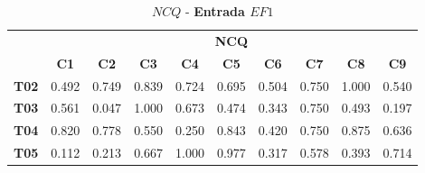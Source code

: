 \begin{table}[htbp]
	\centering
	\caption{$NCQ$ - \textbf{Entrada $EF1$}}
	\begin{tabular}{|c|ccccccccc|}
		\hline
		\rowcolor[HTML]{D0CECE} 
		\cellcolor[HTML]{D0CECE} & \multicolumn{9}{c|}{\cellcolor[HTML]{D0CECE}\textbf{NCQ}} \\ \cline{2-10} 
		\rowcolor[HTML]{D0CECE} 
		\multirow{-2}{*}{\cellcolor[HTML]{D0CECE}\textbf{Part.}} & \multicolumn{1}{c|}{\cellcolor[HTML]{D0CECE}\textbf{C1}} & \multicolumn{1}{c|}{\cellcolor[HTML]{D0CECE}\textbf{C2}} & \multicolumn{1}{c|}{\cellcolor[HTML]{D0CECE}\textbf{C3}} & \multicolumn{1}{c|}{\cellcolor[HTML]{D0CECE}\textbf{C4}} & \multicolumn{1}{c|}{\cellcolor[HTML]{D0CECE}\textbf{C5}} & \multicolumn{1}{c|}{\cellcolor[HTML]{D0CECE}\textbf{C6}} & \multicolumn{1}{c|}{\cellcolor[HTML]{D0CECE}\textbf{C7}} & \multicolumn{1}{c|}{\cellcolor[HTML]{D0CECE}\textbf{C8}} & \textbf{C9} \\ \hline
		\textbf{T02} & \multicolumn{1}{c|}{0.492} & \multicolumn{1}{c|}{0.749} & \multicolumn{1}{c|}{0.839} & \multicolumn{1}{c|}{0.724} & \multicolumn{1}{c|}{0.695} & \multicolumn{1}{c|}{0.504} & \multicolumn{1}{c|}{0.750} & \multicolumn{1}{c|}{1.000} & 0.540 \\ \hline
		\rowcolor[HTML]{F2F2F2} 
		\textbf{T03} & \multicolumn{1}{c|}{\cellcolor[HTML]{F2F2F2}0.561} & \multicolumn{1}{c|}{\cellcolor[HTML]{F2F2F2}0.047} & \multicolumn{1}{c|}{\cellcolor[HTML]{F2F2F2}1.000} & \multicolumn{1}{c|}{\cellcolor[HTML]{F2F2F2}0.673} & \multicolumn{1}{c|}{\cellcolor[HTML]{F2F2F2}0.474} & \multicolumn{1}{c|}{\cellcolor[HTML]{F2F2F2}0.343} & \multicolumn{1}{c|}{\cellcolor[HTML]{F2F2F2}0.750} & \multicolumn{1}{c|}{\cellcolor[HTML]{F2F2F2}0.493} & 0.197 \\ \hline
		\textbf{T04} & \multicolumn{1}{c|}{0.820} & \multicolumn{1}{c|}{0.778} & \multicolumn{1}{c|}{0.550} & \multicolumn{1}{c|}{0.250} & \multicolumn{1}{c|}{0.843} & \multicolumn{1}{c|}{0.420} & \multicolumn{1}{c|}{0.750} & \multicolumn{1}{c|}{0.875} & 0.636 \\ \hline
		\rowcolor[HTML]{F2F2F2} 
		\textbf{T05} & \multicolumn{1}{c|}{\cellcolor[HTML]{F2F2F2}0.112} & \multicolumn{1}{c|}{\cellcolor[HTML]{F2F2F2}0.213} & \multicolumn{1}{c|}{\cellcolor[HTML]{F2F2F2}0.667} & \multicolumn{1}{c|}{\cellcolor[HTML]{F2F2F2}1.000} & \multicolumn{1}{c|}{\cellcolor[HTML]{F2F2F2}0.977} & \multicolumn{1}{c|}{\cellcolor[HTML]{F2F2F2}0.317} & \multicolumn{1}{c|}{\cellcolor[HTML]{F2F2F2}0.578} & \multicolumn{1}{c|}{\cellcolor[HTML]{F2F2F2}0.393} & 0.714 \\ \hline

\end{tabular}
\end{table}

